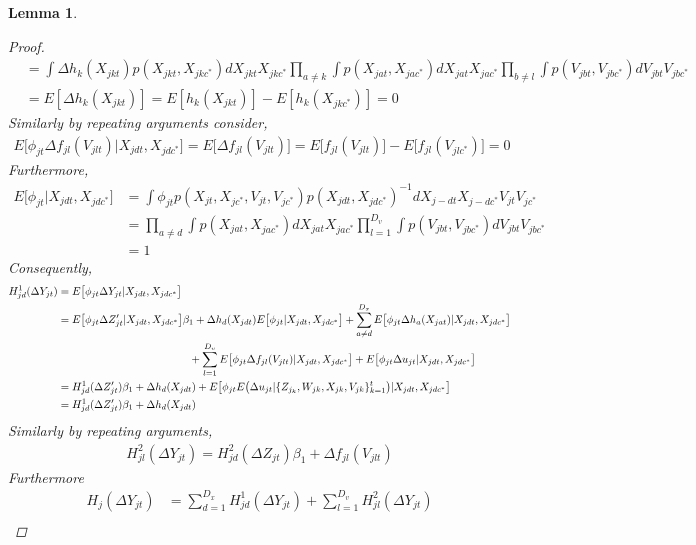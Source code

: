 \documentclass[10pt]{article}
\newtheorem{lemma}{Lemma}
\begin{document}
\begin{lemma}
\begin{proof}
\begin{align*}
%
& = \int \Delta h_k(X_{jkt}) p(X_{jkt},X_{jkc^*}) dX_{jkt} X_{jkc^*} \prod_{a \neq k }\int p(X_{jat},X_{jac^*}) dX_{jat} X_{jac^*} \prod_{b \neq l} \int p(V_{jbt},V_{jbc^*}) dV_{jbt} V_{jbc^*} \\
%
& = E[ \Delta h_k(X_{jkt}) ] = E[ h_k(X_{jkt}) ] - E[ h_k(X_{jkc^*}) ]  = 0
\end{align*}
Similarly by repeating arguments consider,
\begin{align*} 
E \big[\phi_{jt} \Delta f_{jl}(V_{jlt}) |X_{jdt},X_{jdc^*} \big] = E\big[ \Delta f_{jl}(V_{jlt}) \big] = E\big[ f_{jl}(V_{jlt}) \big]  - E\big[ f_{jl}(V_{jlc^*}) \big] = 0
\end{align*}
Furthermore, 
\begin{align*} 
E\big[\phi_{jt} | X_{jdt},X_{jdc^*}\big] &= \int \phi_{jt}p(X_{jt},X_{jc^*},V_{jt},V_{jc^*})p(X_{jdt},X_{jdc^*})^{-1}dX_{j-dt}X_{j-dc^*}V_{jt}V_{jc^*} \\
%
&= \prod_{a \neq d }\int p(X_{jat},X_{jac^*}) dX_{jat} X_{jac^*} \prod_{l=1}^{D_v} \int p(V_{jbt},V_{jbc^*}) dV_{jbt} V_{jbc^*}   \\
& = 1
\end{align*}
Consequently, 
\begin{align*} 
H^1_{jd}(\Delta Y_{jt}) &= E\big[ \phi_{jt} \Delta Y_{jt} | X_{jdt},X_{jdc^*} \big] \\
%
& =E \big[ \phi_{jt} \Delta Z_{jt}' | X_{jdt},X_{jdc^*} \big]\beta_1 + \Delta h_{d}(X_{jdt})E\big[\phi_{jt} | X_{jdt},X_{jdc^*}\big] +  \sum_{a\neq d}^{D_x} E \big[ \phi_{jt} \Delta h_{a}(X_{jat}) | X_{jdt},X_{jdc^*} \big] \\
%
 &\hspace{4.3cm} + \sum_{l=1}^{D_v} E \big[ \phi_{jt} \Delta f_{jl}(V_{jlt}) | X_{jdt},X_{jdc^*} \big] + E\big[  \phi_{jt}\Delta u_{jt} | X_{jdt},X_{jdc^*} \big]  \\
 & = H^1_{jd}(\Delta Z_{jt}')\beta_1 + \Delta h_{d}(X_{jdt}) + E\big[  \phi_{jt} E\big(\Delta u_{jt} |\{Z_{j_k},W_{jk},X_{jk},V_{jk} \}_{k=1}^t \big)| X_{jdt},X_{jdc^*} \big] \\
 &= H^1_{jd}(\Delta Z_{jt}')\beta_1 + \Delta h_{d}(X_{jdt}) 
\end{align*}
Similarly by repeating arguments, 
\begin{align*} 
H^2_{jl}(\Delta Y_{jt}) = H^2_{jd}(\Delta Z_{jt})\beta_1 + \Delta f_{jl}(V_{jlt}) 
\end{align*}
Furthermore
\begin{align*} 
H_j(\Delta Y_{jt} ) &= \sum_{d=1}^{D_x} H^1_{jd}(\Delta Y_{jt}) + \sum_{l=1}^{D_v} H^2_{jl}(\Delta Y_{jt}) \\

\end{align*}
\end{proof}
\end{lemma}
\end{document}
